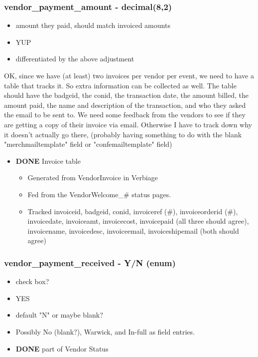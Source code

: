 \documentclass[captions=tablesignature]{scrartcl}
\begin{document}
\subsubsection{vendor\_payment\_amount - decimal(8,2)}
\label{sec-2-2-16}
\begin{itemize}
\item amount they paid, should match invoiced amounts
\item YUP
\item differentiated by the above adjustment
\end{itemize}
OK, since we have (at least) two invoices per vendor per event, we
need to have a table that tracks it.  So extra information can be
collected as well.
The table should have the badgeid, the conid, the transaction
date, the amount billed, the amount paid, the name and description
of the transaction, and who they asked the email to be sent to.
We need some feedback from the vendors to see if they are getting
a copy of their invoice via email.  Otherwise I have to track down
why it doesn't actually go there, (probably having something to do
with the blank "merchmailtemplate" field or "confemailtemplate"
field)
\begin{itemize}
\item {\bfseries\sffamily DONE} Invoice table
\label{sec-2-2-16-1}
\begin{itemize}
\item Generated from VendorInvoice in Verbiage
\item Fed from the VendorWelcome\_\# status pages.
\item Tracked invoiceid, badgeid, conid, invoiceref (\#),
invoiceorderid (\#), invoicedate, invoiceamt, invoicecost,
invoicepaid (all three should agree), invoicename, invoicedesc,
invoiceemail, invoiceshipemail (both should agree)
\end{itemize}
\end{itemize}

\subsubsection{vendor\_payment\_received - Y/N (enum)}
\label{sec-2-2-17}
\begin{itemize}
\item check box?
\item YES
\item default "N" or maybe blank?
\item Possibly No (blank?), Warwick, and In-full as field entries.
\end{itemize}
\begin{itemize}
\item {\bfseries\sffamily DONE} part of Vendor Status
\label{sec-2-2-17-1}
\end{itemize}
\end{document}
